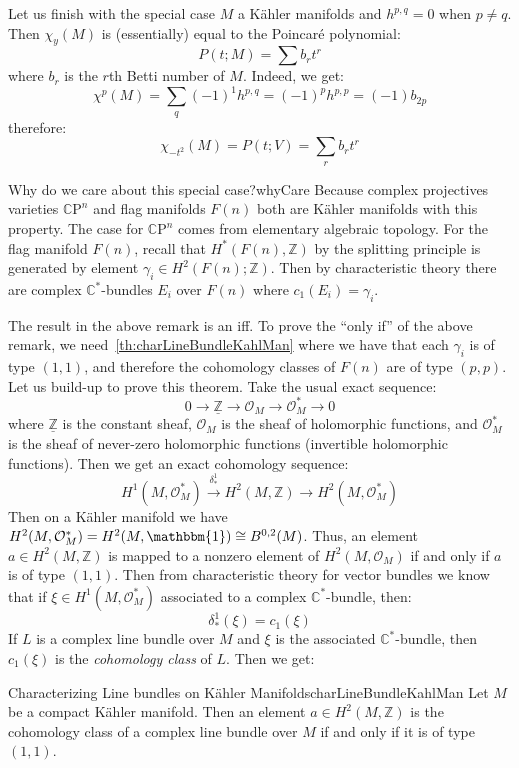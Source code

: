 \documentclass{ut-thesis}
\newcommand{\Z}{{\mathbb{Z}}}
\newcommand{\C}{{\mathbb{C}}}
\newcommand{\CO}{{\mathcal{O}}}
\newcommand{\CP}{{\mathbb{C}\mathrm{P}}}
\begin{document}
Let us finish with the special case $M$ a K\"ahler manifolds and $h^{p,q} = 0$ when $p\ne q$. Then $\chi_y(M)$
is (essentially) equal to the Poincar\'e polynomial:
\[
  P(t; M) = \sum b_rt^r
\]
where $b_r$ is the $r$th Betti number of $M$. Indeed, we get:
\[
  \chi^p(M) = \sum_q (-1)^1 h^{p,q} = (-1)^p h^{p,p} = (-1)b_{2p}
\]
therefore:
\[
  \chi_{-t^2}(M) = P(t;V) = \sum_r b_rt^r
\]
\begin{titledBox}{Why do we care about this special case?}{whyCare}
   Because complex projectives varieties $\CP^n$ and flag manifolds
  $F(n)$ both are K\"ahler manifolds with this property.
  The case for $\CP^n$ comes from elementary algebraic
  topology. For the flag manifold $F(n)$, recall that $H^*(F(n), \Z)$ by the splitting principle is generated by
  element $\gamma_i \in H^2(F(n); \Z)$. Then by characteristic theory there are complex $\C^*$-bundles $E_i$
  over $F(n)$ where $c_1(E_i) = \gamma_i$.
\end{titledBox}
The result in the above remark is an iff. To prove the ``only if'' of the above remark, we
need~\cref{th:charLineBundleKahlMan} where we have that each $\gamma_i$ is of type $(1,1)$, and therefore the
cohomology classes of $F(n)$ are of type $(p,p)$. Let us build-up to prove this theorem. Take the usual exact
sequence:
\[
  0 \to \underline{\Z} \to \CO_M \to \CO_M^* \to 0
\]
where $\underline{\Z}$ is the constant sheaf, $\CO_M$ is the sheaf of holomorphic functions, and $\CO_M^*$ is
the sheaf of never-zero holomorphic functions (invertible holomorphic functions). Then we get an exact
cohomology sequence:
\[
  H^1(M, \CO_M^*) \xrightarrow{\delta_*^1} H^2(M, \Z) \to H^2(M, \CO_M^*)
\]
Then on a K\"ahler manifold we have $H^2(M, \CO_M^*) = H^2(M, \mathbbm{1}) \cong B^{0,2}(M)$. Thus, an element
$a \in H^2(M, \Z)$ is mapped to a nonzero element of $H^2(M, \CO_M)$ if and only if $a$ is of type $(1,1)$.
Then from characteristic theory for vector bundles we know that if $\xi \in H^1(M, \CO_M^*)$ associated to a complex
$\C^*$-bundle, then:
\[
  \delta_*^1(\xi) = c_1(\xi)
\]
If $L$ is a complex line bundle over $M$ and $\xi$ is the associated $\C^*$-bundle, then $c_1(\xi)$ is the
\emph{cohomology class} of $L$. Then we get:

\begin{thm}{Characterizing Line bundles on K\"ahler Manifolds}{charLineBundleKahlMan}
  Let $M$ be a compact K\"ahler manifold. Then an element $a \in H^2(M, \Z)$ is the cohomology class of
  a complex line bundle over $M$ if and only if it is of type $(1,1)$.
\end{thm}
\end{document}
